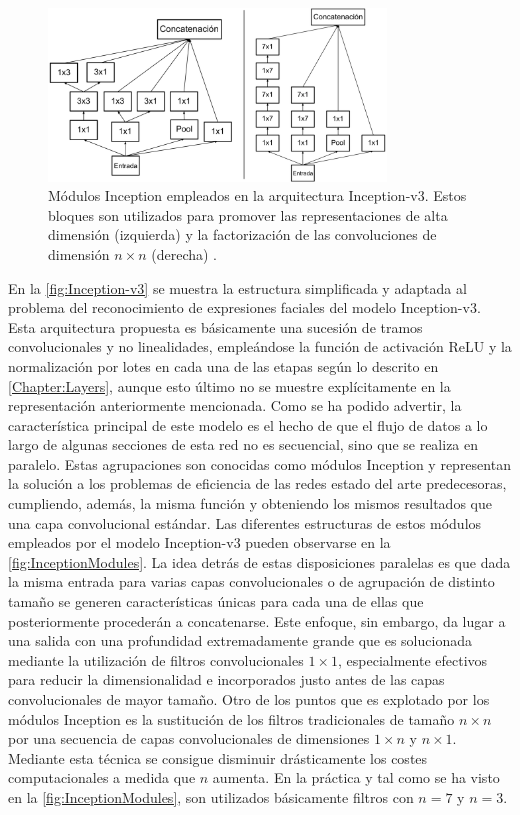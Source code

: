 \begin{figure}
    \centering
    \includegraphics[width=0.8\textwidth]{Images/InceptionModules.png}
    \caption{Módulos Inception empleados en la arquitectura Inception-v3. Estos bloques son utilizados para promover las representaciones de alta dimensión (izquierda) y la factorización de las convoluciones de dimensión $n\times n$ (derecha) \cite{Inception-v3}.}
    \label{fig:InceptionModules}
\end{figure}

En la \autoref{fig:Inception-v3} se muestra la estructura simplificada y adaptada al problema del reconocimiento de expresiones faciales del modelo Inception-v3. Esta arquitectura propuesta es básicamente una sucesión de tramos convolucionales y no linealidades, empleándose la función de activación ReLU y la normalización por lotes en cada una de las etapas según lo descrito en \autoref{Chapter:Layers}, aunque esto último no se muestre explícitamente en la representación anteriormente mencionada. Como se ha podido advertir, la característica principal de este modelo es el hecho de que el flujo de datos a lo largo de algunas secciones de esta red no es secuencial, sino que se realiza en paralelo. Estas agrupaciones son conocidas como módulos Inception y representan la solución a los problemas de eficiencia de las redes estado del arte predecesoras, cumpliendo, además, la misma función y obteniendo los mismos resultados que una capa convolucional estándar. Las diferentes estructuras de estos módulos empleados por el modelo Inception-v3 pueden observarse en la \autoref{fig:InceptionModules}. La idea detrás de estas disposiciones paralelas es que dada la misma entrada para varias capas convolucionales o de agrupación de distinto tamaño se generen características únicas para cada una de ellas que posteriormente procederán a concatenarse. Este enfoque, sin embargo, da lugar a una salida con una profundidad extremadamente grande que es solucionada mediante la utilización de filtros convolucionales $1\times 1$, especialmente efectivos para reducir la dimensionalidad \cite{NetworkInNetwork} e incorporados justo antes de las capas convolucionales de mayor tamaño. Otro de los puntos que es explotado por los módulos Inception es la sustitución de los filtros tradicionales de tamaño $n\times n$ por una secuencia de capas convolucionales de dimensiones $1\times n$ y $n \times 1$. Mediante esta técnica se consigue disminuir drásticamente los costes computacionales a medida que $n$ aumenta. En la práctica y tal como se ha visto en la \autoref{fig:InceptionModules}, son utilizados básicamente filtros con $n = 7$ y $n = 3$.

